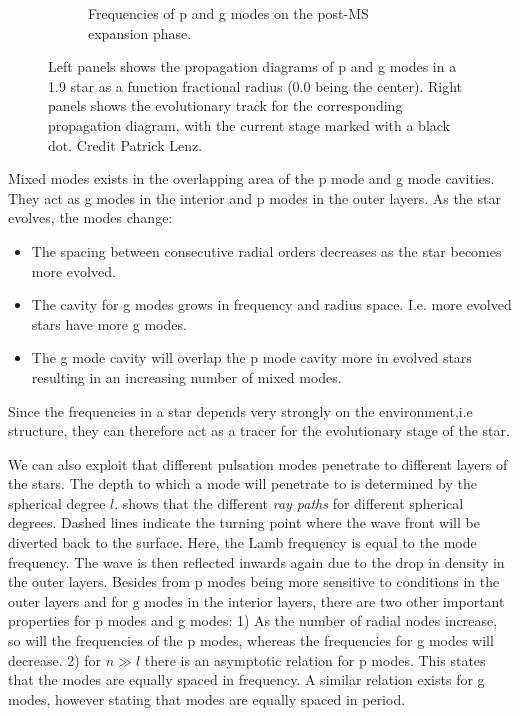 \begin{figure}
\begin{subfigure}[b]{1\textwidth}
		\caption{Frequencies of p and g modes on the post-MS expansion phase. }
		\label{fig:five over x}
	\end{subfigure}
	\caption{ Left panels shows the propagation diagrams of p and g modes in a 1.9 \msun star as a function fractional radius (0.0 being the center). Right panels shows the evolutionary track for the corresponding propagation diagram, with the current stage marked with a black dot. Credit Patrick Lenz.  }
	\label{pandg}
\end{figure}


Mixed modes exists in the overlapping area of the p mode and g mode cavities. They act as g modes in the interior and p modes in the outer layers. As the star evolves, the modes change:

\begin{itemize} 
	\item The spacing between consecutive radial orders decreases as the star becomes more evolved.
	\item The cavity for g modes grows in frequency and radius space. I.e. more evolved stars have more g modes.
	\item The g mode cavity will overlap the p mode cavity more in evolved stars resulting in an increasing number of mixed modes.  
\end{itemize}

Since the frequencies in a star depends very strongly on the environment,i.e structure, they can therefore act as a tracer for the evolutionary stage of the star. 
 
We can also exploit that different pulsation modes penetrate to different layers of the stars. The depth to which a mode will penetrate to is determined by the spherical degree $l$.  shows that the different \textit{ray paths} for different spherical degrees. Dashed lines indicate the turning point where the wave front will be diverted back to the surface. Here, the Lamb frequency is equal to the mode frequency. The wave is then reflected inwards again due to the drop in density in the outer layers. Besides from p modes being more sensitive to conditions in the outer layers and for g modes in the interior layers, there are two other important properties for p modes and g modes: 1) As the number of radial nodes increase, so will the frequencies of the p modes, whereas the frequencies for g modes will decrease. 2) for $n\gg l$ there is an asymptotic relation for p modes. This states that the modes are equally spaced in frequency. A similar relation exists for g modes, however stating that modes are equally spaced in period. 

